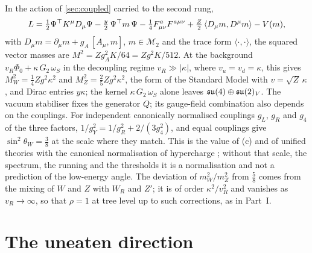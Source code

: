 In the action of \cref{sec:coupled} carried to the second rung,
\[
L=\tfrac12\Psi^\top K^\mu D_\mu\Psi-\tfrac y2\,\Psi^\top m\,\Psi-\tfrac14F^a_{\mu\nu}F^{a\mu\nu}+\tfrac Z2\,\langle D_\mu m,D^\mu m\rangle-V(m),
\]
with $D_\mu m=\partial_\mu m+g_A\,[A_\mu,m]$, $m\in\mathcal M_2$ and the trace form $\langle\cdot,\cdot\rangle$, the squared vector masses are $M^2=Zg_A^2K/64=Zg^2K/512$. At the
background $v_R\Phi_0+\kappa\,G_2\,\omega_S$ in the decoupling regime $v_R\gg|\kappa|$, where $v_u=v_d=\kappa$, this gives $M_W^2=\tfrac14Zg^2\kappa^2$ and
$M_Z^2=\tfrac25Zg^2\kappa^2$, the form of the Standard Model with $v=\sqrt Z\,\kappa$, and Dirac entries $y\kappa$; the kernel
$\kappa\,G_2\,\omega_S$ alone leaves $\mathfrak{su}(4)\oplus\mathfrak{su}(2)_V$. The vacuum stabiliser fixes the generator $Q$; its gauge-field combination also
depends on the couplings. For independent canonically normalised couplings $g_L$, $g_R$ and $g_4$ of the three factors,
$1/g_Y^2=1/g_R^2+2/(3g_4^2)$, and equal couplings give $\sin^2\theta_W=\tfrac38$ at the scale where they match. This is the value of
(c) and of unified theories with the canonical normalisation of hypercharge \cite{GeorgiQuinnWeinberg74,PDGGUT}; without that scale, the spectrum, the running and the thresholds it is a
normalisation and not a prediction of the low-energy angle. The deviation of $m_W^2/m_Z^2$ from $\tfrac58$ comes from the mixing of $W$ and
$Z$ with $W_R$ and $Z'$; it is of order $\kappa^2/v_R^2$ and vanishes as $v_R\to\infty$, so that $\rho=1$ at tree level up to such
corrections, as in Part~I.

\section{The uneaten direction}

